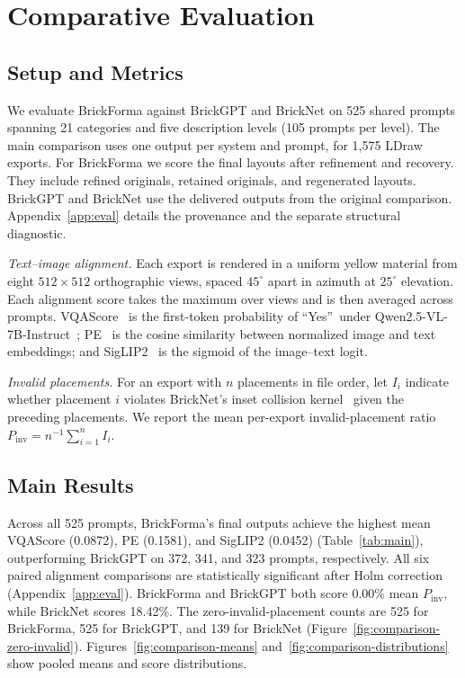 \section{Comparative Evaluation}
\label{sec:eval}
\subsection{Setup and Metrics}
\label{sec:setup}
We evaluate BrickForma against BrickGPT and BrickNet on 525 shared prompts spanning 21 categories and five description levels (105 prompts per level). The main comparison uses one output per system and prompt, for 1,575 LDraw exports. For BrickForma we score the final layouts after refinement and recovery. They include refined originals, retained originals, and regenerated layouts. BrickGPT and BrickNet use the delivered outputs from the original comparison. Appendix~\ref{app:eval} details the provenance and the separate structural diagnostic.

\emph{Text--image alignment.}
Each export is rendered in a uniform yellow material from eight $512{\times}512$ orthographic views, spaced $45^\circ$ apart in azimuth at $25^\circ$ elevation. Each alignment score takes the maximum over views and is then averaged across prompts. VQAScore~\cite{vqascore} is the first-token probability of \textquotedblleft Yes\textquotedblright\ under Qwen2.5-VL-7B-Instruct~\cite{qwen25vl}; PE~\cite{pe} is the cosine similarity between normalized image and text embeddings; and SigLIP2~\cite{siglip2} is the sigmoid of the image--text logit.

\emph{Invalid placements.}
For an export with $n$ placements in file order, let $I_i$ indicate whether placement $i$ violates BrickNet's inset collision kernel~\cite{bricknet} given the preceding placements. We report the mean per-export invalid-placement ratio $P_{\mathrm{inv}}=n^{-1}\sum_{i=1}^{n}I_i$.

\subsection{Main Results}

Across all 525 prompts, BrickForma's final outputs achieve the highest mean VQAScore (0.0872), PE (0.1581), and SigLIP2 (0.0452) (Table~\ref{tab:main}), outperforming BrickGPT on 372, 341, and 323 prompts, respectively. All six paired alignment comparisons are statistically significant after Holm correction (Appendix~\ref{app:eval}). BrickForma and BrickGPT both score 0.00\% mean $P_{\mathrm{inv}}$, while BrickNet scores 18.42\%. The zero-invalid-placement counts are 525 for BrickForma, 525 for BrickGPT, and 139 for BrickNet (Figure~\ref{fig:comparison-zero-invalid}). Figures~\ref{fig:comparison-means} and~\ref{fig:comparison-distributions} show pooled means and score distributions.

